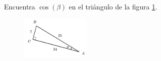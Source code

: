 \question[15] Encuentra $\cos(\beta)$ en el triángulo de la figura \ref{fig:functrig06}.
\begin{figure}[H]
    \begin{center}
        \includegraphics[width=0.3\textwidth]{../images/functrig06.png}
    \end{center}
    \caption{}
    \label{fig:functrig06}
\end{figure}
